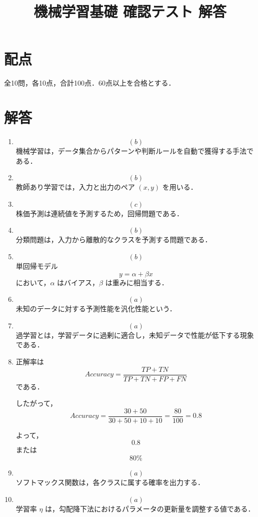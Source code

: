 \documentclass[uplatex,a4paper,12pt]{jsarticle}
\begin{document}
\title{機械学習基礎 確認テスト 解答}
\author{}
\date{}
\maketitle

\section*{配点}
全10問，各10点，合計100点．60点以上を合格とする．

\section*{解答}

\begin{enumerate}

\item
\[
\boxed{(b)}
\]
機械学習は，データ集合からパターンや判断ルールを自動で獲得する手法である．

\item
\[
\boxed{(b)}
\]
教師あり学習では，入力と出力のペア $(x,y)$ を用いる．

\item
\[
\boxed{(c)}
\]
株価予測は連続値を予測するため，回帰問題である．

\item
\[
\boxed{(b)}
\]
分類問題は，入力から離散的なクラスを予測する問題である．

\item
\[
\boxed{(b)}
\]
単回帰モデル
\[
y=\alpha+\beta x
\]
において，$\alpha$ はバイアス，$\beta$ は重みに相当する．

\item
\[
\boxed{(a)}
\]
未知のデータに対する予測性能を汎化性能という．

\item
\[
\boxed{(a)}
\]
過学習とは，学習データに過剰に適合し，未知データで性能が低下する現象である．

\item
正解率は
\[
Accuracy=
\frac{TP+TN}{TP+TN+FP+FN}
\]
である．

したがって，
\[
Accuracy=
\frac{30+50}{30+50+10+10}
=
\frac{80}{100}
=
0.8
\]

よって，
\[
\boxed{0.8}
\]
または
\[
\boxed{80\%}
\]

\item
\[
\boxed{(a)}
\]
ソフトマックス関数は，各クラスに属する確率を出力する．

\item
\[
\boxed{(a)}
\]
学習率 $\eta$ は，勾配降下法におけるパラメータの更新量を調整する値である．

\end{enumerate}
\end{document}
